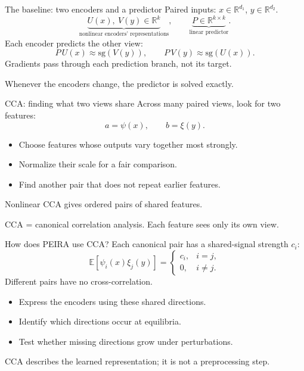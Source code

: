 \documentclass[aspectratio=169]{beamer}
\begin{document}
\begin{frame}{The baseline: two encoders and a predictor}
  Paired inputs: $x\in\mathbb R^{d_1}$, $y\in\mathbb R^{d_2}$.
  \[
    \underbrace{U(x),\ V(y)\in\mathbb R^k}_{\text{nonlinear encoders' representations}},
    \qquad
    \underbrace{P\in\mathbb R^{k\times k}}_{\text{linear predictor}}.
  \]
  Each encoder predicts the other view:
  \[
    P\,U(x)\approx\mathrm{sg}(V(y)),\qquad
    P\,V(y)\approx\mathrm{sg}(U(x)).
  \]
  Gradients pass through each prediction branch, not its target.
  \vspace{0.6em}
  \begin{center}
    \alert{Whenever the encoders change, the predictor is solved exactly.}
  \end{center}
\end{frame}

\begin{frame}{CCA: finding what two views share}
  Across many paired views, look for two features:
  \[
    a=\psi(x),\qquad b=\xi(y).
  \]
  \begin{itemize}
    \item Choose features whose outputs vary together most strongly.
    \item Normalize their scale for a fair comparison.
    \item Find another pair that does not repeat earlier features.
  \end{itemize}
  \begin{center}
    \alert{Nonlinear CCA gives ordered pairs of shared features.}
  \end{center}
  {\small CCA = canonical correlation analysis. Each feature sees only its own view.}
\end{frame}

\begin{frame}{How does PEIRA use CCA?}
  Each canonical pair has a shared-signal strength $c_i$:
  \[
    \mathbb E[\psi_i(x)\xi_j(y)]
      =\begin{cases}c_i,&i=j,\\0,&i\ne j.\end{cases}
  \]
  Different pairs have no cross-correlation.
  \begin{itemize}
    \item Express the encoders using these shared directions.
    \item Identify which directions occur at equilibria.
    \item Test whether missing directions grow under perturbations.
  \end{itemize}
  \begin{center}
    \alert{CCA describes the learned representation; it is not a preprocessing step.}
  \end{center}
\end{frame}
\end{document}
